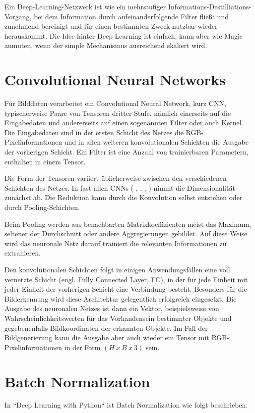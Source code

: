Ein Deep-Learning-Netzwerk ist wie ein mehrstufiger Informations-Destilliations-Vorgang, bei dem Information durch aufeinanderfolgende Filter fließt und zunehmend bereinigt und für einen bestimmten Zweck nutzbar wieder herauskommt. Die Idee hinter Deep Learning ist einfach, kann aber wie Magie anmuten, wenn der simple Mechanismus ausreichend skaliert wird.
\cite{chollet2021deep}

\section{Convolutional Neural Networks}
\label{sec:cnn}
Für Bilddaten verarbeitet ein Convolutional Neural Network, kurz CNN, typischerweise Paare von Tensoren dritter Stufe, nämlich einerseits auf die Eingabedaten und andererseits auf einen sogenannten Filter oder auch Kernel. Die Eingabedaten sind in der ersten Schicht des Netzes die RGB-Pixelinformationen und in allen weiteren konvolutionalen Schichten die Ausgabe der vorherigen Schicht. Ein Filter ist eine Anzahl von trainierbaren Parametern, enthalten in einem Tensor.

Die Form der Tensoren variiert üblicherweise zwischen den verschiedenen Schichten des Netzes. In fast allen CNNs ( \cite{isola2018imagetoimage}, \cite{goodfellow2016deeplearning}, \cite{Lecun99objectrecognition}, \cite{RFB15a}) nimmt die Dimensionalität zunächst ab. Die Reduktion kann durch die Konvolution selbst entstehen oder durch Pooling-Schichten.

Beim Pooling werden aus benachbarten Matrixkoeffizienten meist das Maximum, seltener der Durchschnitt oder andere Aggregierungen gebildet. Auf diese Weise wird das neuronale Netz darauf trainiert die relevanten Informationen zu extrahieren. \cite{goodfellow2016deeplearning}

Den konvolutionalen Schichten folgt in einigen Anwendungsfällen eine voll vernetzte Schicht (engl. Fully Connected Layer, FC), in der für jede Einheit mit jeder Einheit der vorherigen Schicht eine Verbindung besteht. Besonders für die Bilderkennung wird diese Architektur gelegentlich erfolgreich eingesetzt. Die Ausgabe des neuronalen Netzes ist dann ein Vektor, beispielsweise von Wahrscheinlichkeitswerten für das Vorhandensein bestimmter Objekte und gegebenenfalls Bildkoordinaten der erkannten Objekte. Im Fall der Bildgenerierung kann die Ausgabe aber auch wieder ein Tensor mit RGB-Pixelinformationen in der Form $(H\ x\ B\ x\ 3)$ sein.

\section{Batch Normalization}
In ``Deep Learning with Python`` \cite{chollet2021deep} ist Batch Normalization wie folgt beschrieben:

